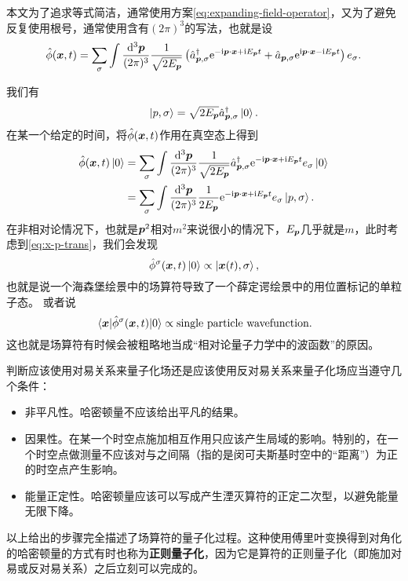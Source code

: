 \documentclass[hyperref, UTF8, a4paper]{ctexart}
\newcommand*{\ii}{\mathrm{i}}
\newcommand*{\ee}{\mathrm{e}}
\begin{document}
本文为了追求等式简洁，通常使用方案\eqref{eq:expanding-field-operator}，又为了避免反复使用根号，通常使用含有$(2\pi)^3$的写法，也就是设
\begin{equation}
    \hat{\phi}(\vb*{x}, t) = \sum_\sigma \int \frac{\dd[3]{\vb*{p}}}{(2\pi)^3} \frac{1}{\sqrt{2 E_{\vb*{p}}}} \left( \hat{a}^\dagger_{\vb*{p}, \sigma} \ee^{- \ii \vb*{p} \cdot \vb*{x} + \ii E_{\vb*{p}} t} + \hat{a}_{\vb*{p}, \sigma} \ee^{\ii \vb*{p} \cdot \vb*{x} - \ii E_{\vb*{p}} t} \right) e_\sigma. 
    \label{eq:field-operator-fourier}
\end{equation}

我们有
\[
    \ket{p, \sigma} = \sqrt{2 E_{\vb*{p}}} \hat{a}^\dagger_{\vb*{p}, \sigma} \ket{0}.
\]
在某一个给定的时间，将$\hat{\phi}(\vb*{x}, t)$作用在真空态上得到
\[
    \begin{aligned}
        \hat{\phi}(\vb*{x}, t) \ket{0} &= \sum_\sigma \int \frac{\dd[3]{\vb*{p}}}{(2\pi)^3} \frac{1}{\sqrt{2 E_{\vb*{p}}}} \hat{a}^\dagger_{\vb*{p}, \sigma} \ee^{- \ii \vb*{p} \cdot \vb*{x} + \ii E_{\vb*{p}} t} e_{\sigma} \ket{0} \\
        &= \sum_\sigma \int \frac{\dd[3]{\vb*{p}}}{(2\pi)^3} \frac{1}{2 E_{\vb*{p}}} \ee^{- \ii \vb*{p} \cdot \vb*{x} + \ii E_{\vb*{p}} t} e_{\sigma} \ket{p, \sigma}.
    \end{aligned}
\]
在非相对论情况下，也就是$\vb*{p}^2$相对$m^2$来说很小的情况下，$E_{\vb*{p}}$几乎就是$m$，此时考虑到\eqref{eq:x-p-trans}，我们会发现
\[
    \hat{\phi}^\sigma (\vb*{x}, t) \ket{0} \propto \ket{\vb*{x}(t), \sigma},
\]
也就是说一个海森堡绘景中的场算符导致了一个薛定谔绘景中的用位置标记的单粒子态。
或者说
\[
    \mel{\vb*{x}}{\hat{\phi}^\sigma (\vb*{x}, t)}{0} \propto \text{single particle wavefunction}.
\]
这也就是场算符有时候会被粗略地当成“相对论量子力学中的波函数”的原因。

判断应该使用对易关系来量子化场还是应该使用反对易关系来量子化场应当遵守几个条件：
\begin{itemize}
    \item 非平凡性。哈密顿量不应该给出平凡的结果。
    \item 因果性。在某一个时空点施加相互作用只应该产生局域的影响。特别的，在一个时空点做测量不应该对与之间隔（指的是闵可夫斯基时空中的“距离”）为正的时空点产生影响。
    \item 能量正定性。哈密顿量应该可以写成产生湮灭算符的正定二次型，以避免能量无限下降。
\end{itemize}

以上给出的步骤完全描述了场算符的量子化过程。这种使用傅里叶变换得到对角化的哈密顿量的方式有时也称为\textbf{正则量子化}，因为它是算符的正则量子化（即施加对易或反对易关系）之后立刻可以完成的。
\end{document}
